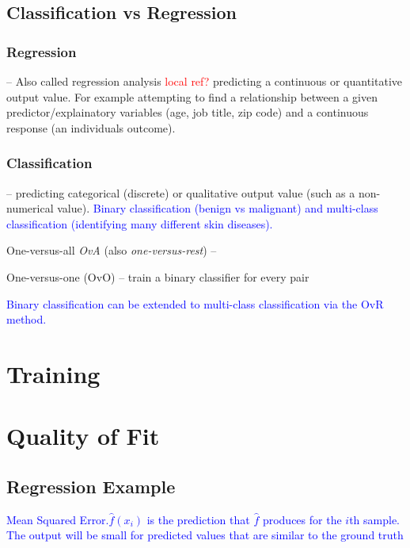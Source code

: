 \subsection{Classification vs Regression}

\subsubsection{Regression} -- Also called regression analysis \textcolor{red}{local ref?} predicting a continuous or quantitative output value. For example attempting to find a relationship between a given predictor/explainatory variables (age, job title, zip code) and a continuous response (an individuals outcome).

\subsubsection{Classification} -- predicting categorical (discrete) or qualitative output value (such as a non-numerical value). \textcolor{blue}{Binary classification (benign vs malignant) and multi-class classification (identifying many different skin diseases).}

One-versus-all \emph{OvA} (also \emph{one-versus-rest}) -- 

One-versus-one (OvO) -- train a binary classifier for every pair


\textcolor{blue}{Binary classification can be extended to multi-class classification via the OvR method.}


\section{Training}

\section{Quality of Fit}


\subsection{Regression Example}

\textcolor{blue}{Mean Squared Error.$\hat{f}(x_i)$ is the prediction that $\hat{f}$ produces for the $i$th sample. The output will be small for predicted values that are similar to the ground truth}

